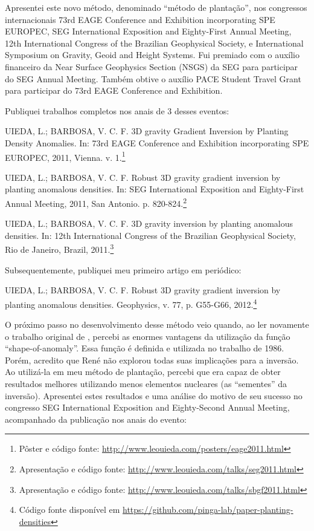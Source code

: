 \documentclass[12pt,a4paper,oneside,titlepage,onecolumn]{article}
\begin{document}
Apresentei este novo método, denominado ``método de plantação'',  nos
congressos internacionais
73rd EAGE Conference and Exhibition incorporating SPE EUROPEC,
SEG International Exposition and Eighty-First Annual Meeting,
12th International Congress of the Brazilian Geophysical Society,
e
International Symposium on Gravity, Geoid and Height Systems.
Fui premiado com o auxílio financeiro da Near Surface Geophysics Section (NSGS)
da SEG para participar do SEG Annual Meeting.
Também obtive o auxílio PACE Student Travel Grant para participar do 73rd EAGE
Conference and Exhibition.

Publiquei trabalhos completos nos anais de 3 desses eventos:

\begin{displayquote}
    UIEDA, L.; BARBOSA, V. C. F. 3D gravity Gradient Inversion by Planting
    Density Anomalies. In: 73rd EAGE Conference and Exhibition incorporating
    SPE EUROPEC, 2011, Vienna. v. 1.\footnote{Pôster e código fonte:
    \url{http://www.leouieda.com/posters/eage2011.html}}
\end{displayquote}

\begin{displayquote}
    UIEDA, L.; BARBOSA, V. C. F. Robust 3D gravity gradient
    inversion by planting anomalous densities. In: SEG International Exposition
    and Eighty-First Annual Meeting, 2011, San Antonio. p.
    820-824.\footnote{Apresentação e código fonte:
    \url{http://www.leouieda.com/talks/seg2011.html}}
\end{displayquote}

\begin{displayquote}
    UIEDA, L.; BARBOSA, V. C. F. 3D gravity inversion by planting
    anomalous densities. In: 12th International Congress of the Brazilian
    Geophysical Society, Rio de Janeiro, Brazil,
    2011.\footnote{Apresentação e código fonte:
    \url{http://www.leouieda.com/talks/sbgf2011.html}}
\end{displayquote}

Subsequentemente, publiquei meu primeiro artigo em periódico:

\begin{displayquote}
    UIEDA, L.; BARBOSA, V. C. F. Robust 3D gravity gradient inversion by
    planting anomalous densities. Geophysics, v. 77, p. G55-G66,
    2012.\footnote{Código fonte disponível em
    \url{https://github.com/pinga-lab/paper-planting-densities}}
\end{displayquote}

O próximo passo no desenvolvimento desse método veio quando, ao ler novamente o
trabalho original de \citet{rene}, percebi as enormes vantagens da utilização
da função ``shape-of-anomaly''.
Essa função é definida e utilizada no trabalho de 1986.
Porém, acredito que René não explorou todas suas implicações para a inversão.
Ao utilizá-la em meu método de plantação, percebi que era capaz de obter
resultados melhores utilizando menos elementos nucleares (as ``sementes'' da
inversão).
Apresentei estes resultados e uma análise do motivo de seu sucesso no congresso
SEG International Exposition and Eighty-Second Annual Meeting,
acompanhado da publicação nos anais do evento:
\end{document}
